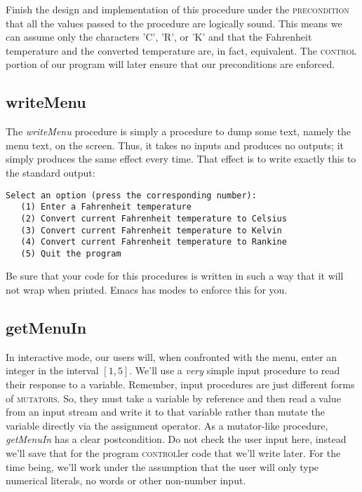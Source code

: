 \documentclass[]{tufte-handout}
\begin{document}
Finish the design and implementation of this procedure under the \textsc{precondition} that all the values passed to the procedure are logically sound.  This means we can assume only the characters 'C', 'R', or 'K' and that the Fahrenheit temperature and the converted temperature are, in fact, equivalent. The \textsc{control} portion of our program will later ensure that our preconditions are enforced.

\subsection{writeMenu}

The \textit{writeMenu} procedure is simply a procedure to dump some text, namely the menu text, on the screen. Thus, it takes no inputs and produces no outputs; it simply produces the same effect every time.  That effect is to write exactly this to the standard output:
\begin{verbatim}
Select an option (press the corresponding number):
   (1) Enter a Fahrenheit temperature
   (2) Convert current Fahrenheit temperature to Celsius
   (3) Convert current Fahrenheit temperature to Kelvin
   (4) Convert current Fahrenheit temperature to Rankine
   (5) Quit the program
\end{verbatim}
Be sure that your code for this procedures is written in such a way that it will not wrap when printed. Emacs has modes to enforce this for you.

\subsection{getMenuIn}

In interactive mode, our users will, when confronted with the menu, enter an integer in the interval $[1,5]$.  We'll use a \textit{very} simple input procedure to read their response to a variable. Remember, input procedures are just different forms of \textsc{mutators}. So, they must take a variable by reference and then read a value from an input stream and write it to that variable rather than mutate the variable directly via the assignment operator.  As a mutator-like procedure, \textit{getMenuIn} has a clear postcondition. Do not check the user input here, instead we'll save that for the program \textsc{control}ler code that we'll write later. For the time being, we'll work under the assumption that the user will only type numerical literals, no words or other non-number input. 
\end{document}
